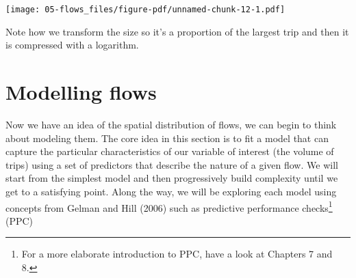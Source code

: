 \documentclass[
  letterpaper,
  DIV=11,
  numbers=noendperiod,
  oneside]{scrreprt}
\newenvironment{Shaded}{\begin{snugshade}}{\end{snugshade}}
\newcommand{\AttributeTok}[1]{\textcolor[rgb]{0.40,0.45,0.13}{#1}}
\newcommand{\CommentTok}[1]{\textcolor[rgb]{0.37,0.37,0.37}{#1}}
\newcommand{\ConstantTok}[1]{\textcolor[rgb]{0.56,0.35,0.01}{#1}}
\newcommand{\DecValTok}[1]{\textcolor[rgb]{0.68,0.00,0.00}{#1}}
\newcommand{\FunctionTok}[1]{\textcolor[rgb]{0.28,0.35,0.67}{#1}}
\newcommand{\NormalTok}[1]{\textcolor[rgb]{0.00,0.23,0.31}{#1}}
\newcommand{\SpecialCharTok}[1]{\textcolor[rgb]{0.37,0.37,0.37}{#1}}
\newcommand{\StringTok}[1]{\textcolor[rgb]{0.13,0.47,0.30}{#1}}
\begin{document}
\begin{Shaded}
\end{Shaded}

\texttt{[image: 05-flows\_files/figure-pdf/unnamed-chunk-12-1.pdf]}

Note how we transform the size so it's a proportion of the largest trip
and then it is compressed with a logarithm.

\section{Modelling flows}\label{modelling-flows}

Now we have an idea of the spatial distribution of flows, we can begin
to think about modeling them. The core idea in this section is to fit a
model that can capture the particular characteristics of our variable of
interest (the volume of trips) using a set of predictors that describe
the nature of a given flow. We will start from the simplest model and
then progressively build complexity until we get to a satisfying point.
Along the way, we will be exploring each model using concepts from
Gelman and Hill (2006) such as predictive performance checks\footnote{For
  a more elaborate introduction to PPC, have a look at Chapters 7 and 8.}
(PPC)
\end{document}
